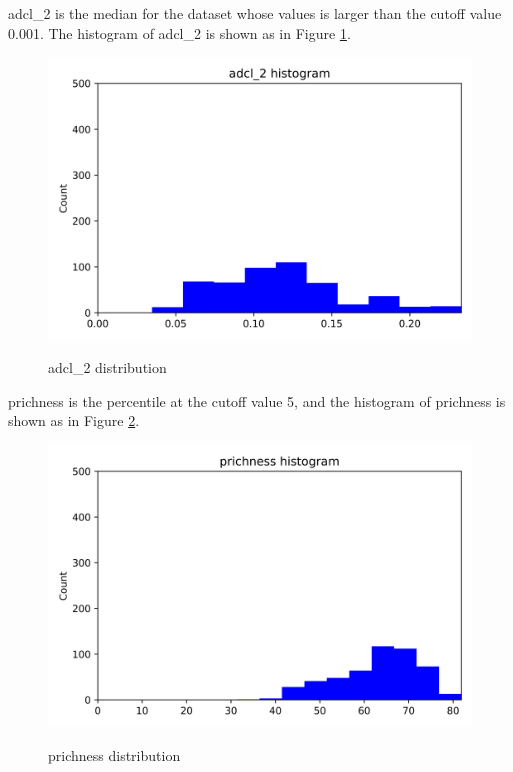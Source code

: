 \documentclass{article}
\begin{document}
adcl_2 is the median for the dataset whose values is larger than the cutoff value 0.001. The histogram of adcl_2 is shown as in Figure \ref{adcl_2-communitylevel}.
\begin{figure}[htbp]
	\centering
	\includegraphics[width=\textwidth, keepaspectratio]{adcl_2-communitylevel.png}\\
	\caption{adcl_2 distribution}
	\label{adcl_2-communitylevel}
\end{figure}
prichness is the percentile at the cutoff value 5, and the histogram of prichness is shown as in Figure \ref{prichness-communitylevel}.
\begin{figure}[htbp]
	\centering
	\includegraphics[width=\textwidth, keepaspectratio]{prichness-communitylevel.png}\\
	\caption{prichness distribution}
	\label{prichness-communitylevel}
\end{figure}
\end{document}
